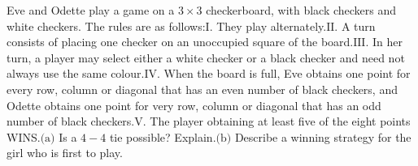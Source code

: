 Eve and Odette play a game on a $3\times 3$ checkerboard, with black checkers and white checkers. The rules are as follows:$\text{I.}$ They play alternately.$\text{II.}$ A turn consists of placing one checker on an unoccupied square of the board.$\text{III.}$ In her turn, a player may select either a white checker or a black checker and need not always use the same colour.$\text{IV.}$ When the board is full, Eve obtains one point for every row, column or diagonal that has an even number of black checkers, and Odette obtains one point for very row, column or diagonal that has an odd number of black checkers.$\text{V.}$ The player obtaining at least five of the eight points WINS.$\text{(a)}$ Is a $4-4$ tie possible? Explain.$\text{(b)}$ Describe a winning strategy for the girl who is first to play.